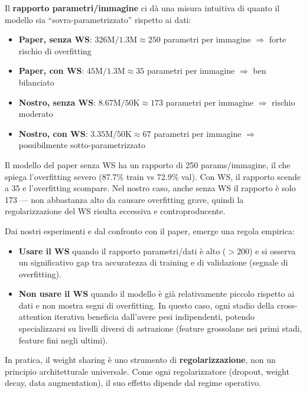 \documentclass[12pt,a4paper]{article}
\begin{document}
\begin{examplebox}
Il \textbf{rapporto parametri/immagine} ci d\`a una misura intuitiva di quanto il modello sia ``sovra-parametrizzato'' rispetto ai dati:
\begin{itemize}
    \item \textbf{Paper, senza WS}: $326\text{M} / 1.3\text{M} \approx 250$ parametri per immagine $\Rightarrow$ forte rischio di overfitting
    \item \textbf{Paper, con WS}: $45\text{M} / 1.3\text{M} \approx 35$ parametri per immagine $\Rightarrow$ ben bilanciato
    \item \textbf{Nostro, senza WS}: $8.67\text{M} / 50\text{K} \approx 173$ parametri per immagine $\Rightarrow$ rischio moderato
    \item \textbf{Nostro, con WS}: $3.35\text{M} / 50\text{K} \approx 67$ parametri per immagine $\Rightarrow$ possibilmente sotto-parametrizzato
\end{itemize}
Il modello del paper senza WS ha un rapporto di 250 params/immagine, il che spiega l'overfitting severo (87.7\% train vs 72.9\% val). Con WS, il rapporto scende a 35 e l'overfitting scompare. Nel nostro caso, anche senza WS il rapporto \`e solo 173 --- non abbastanza alto da causare overfitting grave, quindi la regolarizzazione del WS risulta eccessiva e controproducente.
\end{examplebox}

\begin{notabox}
Dai nostri esperimenti e dal confronto con il paper, emerge una regola empirica:
\begin{itemize}
    \item \textbf{Usare il WS} quando il rapporto parametri/dati \`e alto ($> 200$) e si osserva un significativo gap tra accuratezza di training e di validazione (segnale di overfitting).
    \item \textbf{Non usare il WS} quando il modello \`e gi\`a relativamente piccolo rispetto ai dati e non mostra segni di overfitting. In questo caso, ogni stadio della cross-attention iterativa beneficia dall'avere pesi indipendenti, potendo specializzarsi su livelli diversi di astrazione (feature grossolane nei primi stadi, feature fini negli ultimi).
\end{itemize}
In pratica, il weight sharing \`e uno strumento di \textbf{regolarizzazione}, non un principio architetturale universale. Come ogni regolarizzatore (dropout, weight decay, data augmentation), il suo effetto dipende dal regime operativo.
\end{notabox}
\end{document}
